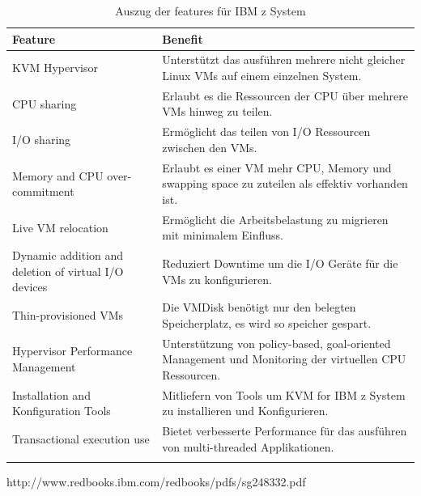 \documentclass[14pt]{extreport}
\begin{document}
\begin{longtable}{|p{5cm}|p{10cm}|}
\hline
\textbf{Feature}                                     & \textbf{Benefit}                                                                                      \\ \hline
KVM Hypervisor                                       & Unterstützt das ausführen mehrere nicht gleicher Linux VMs auf einem einzelnen System.                  \\ \hline
CPU sharing                                          & Erlaubt es die Ressourcen der CPU über mehrere VMs hinweg zu teilen.                                   \\ \hline
I/O sharing                                          & Ermöglicht das teilen von I/O Ressourcen zwischen den VMs.                                             \\ \hline
Memory and CPU over-commitment                       & Erlaubt es einer VM mehr CPU, Memory und swapping space zu zuteilen als effektiv vorhanden ist.       \\ \hline
Live VM relocation                                   & Ermöglicht die Arbeitsbelastung zu migrieren mit minimalem Einfluss.                                  \\ \hline
Dynamic addition and deletion of virtual I/O devices & Reduziert Downtime um die I/O Geräte für die VMs zu konfigurieren.                                    \\ \hline
Thin-provisioned VMs                                 & Die VMDisk benötigt nur den belegten Speicherplatz, es wird so speicher gespart.                      \\ \hline
Hypervisor Performance Management                    & Unterstützung von policy-based, goal-oriented Management und Monitoring der virtuellen CPU Ressourcen. \\ \hline
Installation and Konfiguration Tools                 & Mitliefern von Tools um KVM for IBM z System zu installieren und Konfigurieren.                     \\ \hline
Transactional execution use                          & Bietet verbesserte Performance für das ausführen von multi-threaded Applikationen.                     \\ \hline
\caption{Auszug der features für IBM z System \cite{website:vmwareEsxi}}
\end{longtable}
http://www.redbooks.ibm.com/redbooks/pdfs/sg248332.pdf
\end{document}
